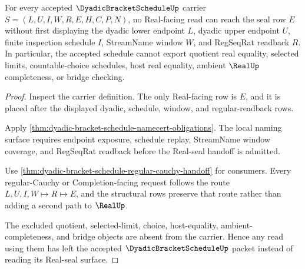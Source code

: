 \begin{theorem}
\label{thm:dyadic-bracket-schedule-real-seal-nonescape}
For every accepted $\DyadicBracketScheduleUp$ carrier $S=(L,U,I,W,R,E,H,C,P,N)$, no Real-facing read can reach the seal row $E$ without first displaying the dyadic lower endpoint $L$, dyadic upper endpoint $U$, finite inspection schedule $I$, StreamName window $W$, and RegSeqRat readback $R$. In particular, the accepted schedule cannot export quotient real equality, selected limits, countable-choice schedules, host real equality, ambient $\RealUp$ completeness, or bridge checking.
\end{theorem}
\begin{proof}
Inspect the carrier definition. The only Real-facing row is $E$, and it is placed after the displayed dyadic, schedule, window, and regular-readback rows.

Apply \autoref{thm:dyadic-bracket-schedule-namecert-obligations}. The local naming surface requires endpoint exposure, schedule replay, StreamName window coverage, and RegSeqRat readback before the Real-seal handoff is admitted.

Use \autoref{thm:dyadic-bracket-schedule-regular-cauchy-handoff} for consumers. Every regular-Cauchy or Completion-facing request follows the route $L,U,I,W \longmapsto R \longmapsto E$, and the structural rows preserve that route rather than adding a second path to $\RealUp$.

The excluded quotient, selected-limit, choice, host-equality, ambient-completeness, and bridge objects are absent from the carrier. Hence any read using them has left the accepted $\DyadicBracketScheduleUp$ packet instead of reading its Real-seal surface.
\end{proof}



